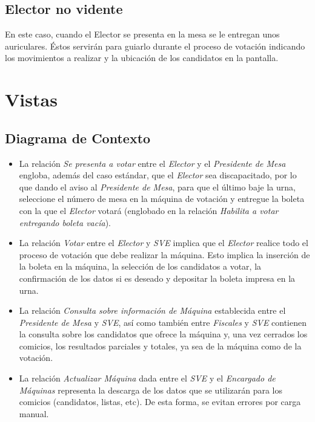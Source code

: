 \documentclass[spanish, 10pt,a4paper]{article}
\numberwithin{equation}{section} %
\begin{document}
\subsection{Elector no vidente}

	En este caso, cuando el Elector se presenta en la mesa se le entregan unos auriculares. Éstos servirán para guiarlo durante el proceso de votación indicando los movimientos a realizar y la ubicación de los candidatos en la pantalla.

\newpage
\section{Vistas}
\subsection{Diagrama de Contexto}

\begin{itemize}
\item La relación \textit{Se presenta a votar} entre el \textit{Elector} y el \textit{Presidente de Mesa} engloba, además del caso estándar, que el \textit{Elector} sea discapacitado, por lo que dando el aviso al \textit{Presidente de Mesa}, para que el último baje la urna, seleccione el número de mesa en la máquina de votación y entregue la boleta con la que el \textit{Elector} votará (englobado en la relación \textit{Habilita a votar entregando boleta vacía}).
\item La relación \textit{Votar} entre el \textit{Elector} y \textit{SVE} implica que el \textit{Elector} realice todo el proceso de votación que debe realizar la máquina. Esto implica la inserción de la boleta en la máquina, la selección de los candidatos a votar, la confirmación de los datos si es deseado y depositar la boleta impresa en la urna.
\item La relación \textit{Consulta sobre información de Máquina} establecida entre el \textit{Presidente de Mesa} y \textit{SVE}, así como también entre \textit{Fiscales} y \textit{SVE} contienen la consulta sobre los candidatos que ofrece la máquina y, una vez cerrados los comicios, los resultados parciales y totales, ya sea de la máquina como de la votación.
\item La relación \textit{Actualizar Máquina} dada entre el \textit{SVE} y el \textit{Encargado de Máquinas} representa la descarga de los datos que se utilizarán para los comicios (candidatos, listas, etc). De esta forma, se evitan errores por carga manual.
\end{itemize}
\end{document}
